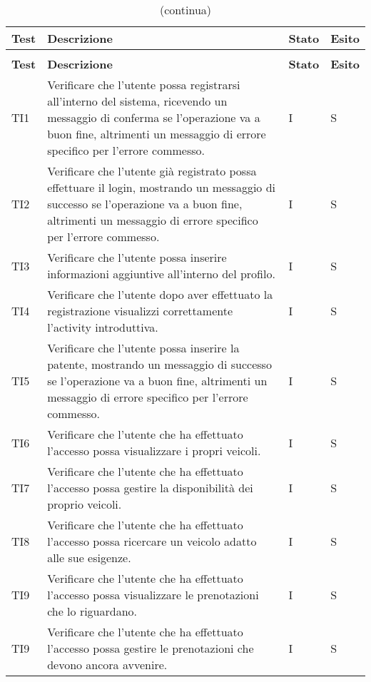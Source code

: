 \begin{longtable}{ >{\centering}p{} >{\centering}p{} >{\centering}p{}
			>{\centering}p{}}%
			
		\caption{Riepilogo test di integrazione}\\	
		\rowcolorhead
		\textbf{\color{white}Test}  
		& \textbf{\color{white}Descrizione} 
		& \textbf{\color{white}Stato}
		& \centering\textbf{\color{white}Esito}
		\tabularnewline %
		\endfirsthead	
		
		\rowcolor{white}\caption[]{(continua)}\\	
		\rowcolorhead
		\textbf{\color{white}Test} 
		& \textbf{\color{white}Descrizione}
		& \textbf{\color{white}Stato} 
		& \centering\textbf{\color{white}Esito}
		\tabularnewline %
		\endhead	
TI1&Verificare che l'utente possa registrarsi all'interno del sistema, ricevendo un messaggio di conferma se l'operazione va a buon fine, altrimenti un messaggio di errore specifico per l'errore commesso. & I & S \tabularnewline

TI2&Verificare che l'utente già registrato possa effettuare il login, mostrando un messaggio di successo se l'operazione va a buon fine, altrimenti un messaggio di errore specifico per l'errore commesso. & I & S \tabularnewline

TI3&Verificare che l'utente possa inserire informazioni aggiuntive all'interno del profilo. & I & S \tabularnewline 

TI4&Verificare che l'utente dopo aver effettuato la registrazione visualizzi correttamente l'activity introduttiva. & I & S \tabularnewline

TI5&Verificare che l'utente possa inserire la patente, mostrando un messaggio di successo se l'operazione va a buon fine, altrimenti un messaggio di errore specifico per l'errore commesso. & I & S \tabularnewline

TI6&Verificare che l'utente che ha effettuato l'accesso possa visualizzare i propri veicoli. & I & S \tabularnewline

TI7&Verificare che l'utente che ha effettuato l'accesso possa gestire la disponibilità dei proprio veicoli. & I & S \tabularnewline


TI8&Verificare che l'utente che ha effettuato l'accesso possa ricercare un veicolo adatto alle sue esigenze. & I & S \tabularnewline

TI9&Verificare che l'utente che ha effettuato l'accesso possa visualizzare le prenotazioni che lo riguardano. & I & S \tabularnewline

TI9&Verificare che l'utente che ha effettuato l'accesso possa gestire le prenotazioni che devono ancora avvenire. & I & S \tabularnewline

\end{longtable}		
		
